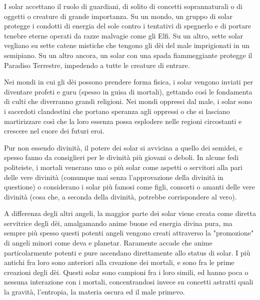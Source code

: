 \begin{multicols}{2}
	I solar accettano il ruolo di guardiani, di solito di concetti soprannaturali o di oggetti o creature di grande importanza. Su un mondo, un gruppo di solar protegge i condotti di energia del sole contro i tentativi di spegnerlo e di portare tenebre eterne operati da razze malvagie come gli Elfi. Su un altro, sette solar vegliano su sette catene mistiche che tengono gli dèi del male imprigionati in un semipiano. Su un altro ancora, un solar con una spada fiammeggiante protegge il Paradiso Terrestre, impedendo a tutte le creature di entrare.

	Nei mondi in cui gli dèi possono prendere forma fisica, i solar vengono inviati per diventare profeti e guru (spesso in guisa di mortali), gettando così le fondamenta di culti che diverranno grandi religioni. Nei mondi oppressi dal male, i solar sono i sacerdoti clandestini che portano speranza agli oppressi o che si lasciano martirizzare così che la loro essenza possa esplodere nelle regioni circostanti e crescere nel cuore dei futuri eroi.

	Pur non essendo divinità, il potere dei solar si avvicina a quello dei semidei, e spesso fanno da consiglieri per le divinità più giovani o deboli. In alcune fedi politeiste, i mortali venerano uno o più solar come aspetti o servitori alla pari delle vere divinità (comunque mai senza l'approvazione della divinità in questione) o considerano i solar più famosi come figli, consorti o amanti delle vere divinità (cosa che, a seconda della divinità, potrebbe corrispondere al vero).

	A differenza degli altri angeli, la maggior parte dei solar viene creata come diretta servitrice degli dèi, amalgamando anime buone ed energia divina pura, ma sempre più spesso questi potenti angeli vengono creati attraverso la "promozione" di angeli minori come deva e planetar. Raramente accade che anime particolarmente potenti e pure ascendano direttamente allo status di solar. I più antichi fra loro sono anteriori alla creazione dei mortali, e sono fra le prime creazioni degli dèi. Questi solar sono campioni fra i loro simili, ed hanno poca o nessuna interazione con i mortali, concentrandosi invece su concetti astratti quali la gravità, l'entropia, la materia oscura ed il male primevo.


\end{multicols}
